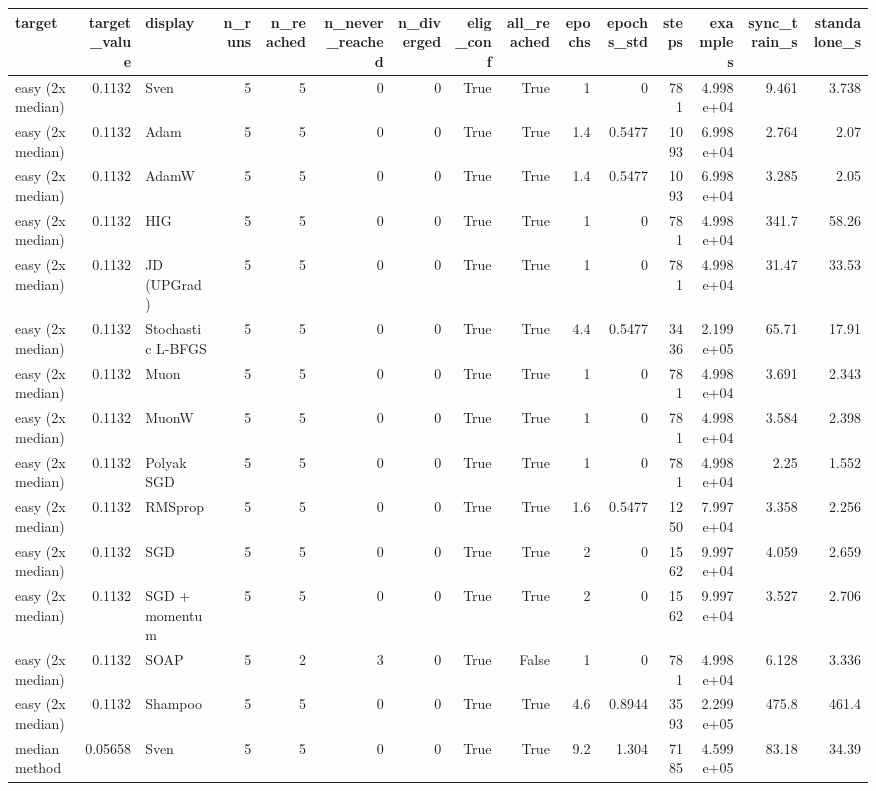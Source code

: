 \begin{tabular}{lrlrrrrrrrrrrrr}
\toprule
target & target\_value & display & n\_runs & n\_reached & n\_never\_reached & n\_diverged & elig\_conf & all\_reached & epochs & epochs\_std & steps & examples & sync\_train\_s & standalone\_s \\
\midrule
easy (2x median) & 0.1132 & Sven & 5 & 5 & 0 & 0 & True & True & 1 & 0 & 781 & 4.998e+04 & 9.461 & 3.738 \\
easy (2x median) & 0.1132 & Adam & 5 & 5 & 0 & 0 & True & True & 1.4 & 0.5477 & 1093 & 6.998e+04 & 2.764 & 2.07 \\
easy (2x median) & 0.1132 & AdamW & 5 & 5 & 0 & 0 & True & True & 1.4 & 0.5477 & 1093 & 6.998e+04 & 3.285 & 2.05 \\
easy (2x median) & 0.1132 & HIG & 5 & 5 & 0 & 0 & True & True & 1 & 0 & 781 & 4.998e+04 & 341.7 & 58.26 \\
easy (2x median) & 0.1132 & JD (UPGrad) & 5 & 5 & 0 & 0 & True & True & 1 & 0 & 781 & 4.998e+04 & 31.47 & 33.53 \\
easy (2x median) & 0.1132 & Stochastic L-BFGS & 5 & 5 & 0 & 0 & True & True & 4.4 & 0.5477 & 3436 & 2.199e+05 & 65.71 & 17.91 \\
easy (2x median) & 0.1132 & Muon & 5 & 5 & 0 & 0 & True & True & 1 & 0 & 781 & 4.998e+04 & 3.691 & 2.343 \\
easy (2x median) & 0.1132 & MuonW & 5 & 5 & 0 & 0 & True & True & 1 & 0 & 781 & 4.998e+04 & 3.584 & 2.398 \\
easy (2x median) & 0.1132 & Polyak SGD & 5 & 5 & 0 & 0 & True & True & 1 & 0 & 781 & 4.998e+04 & 2.25 & 1.552 \\
easy (2x median) & 0.1132 & RMSprop & 5 & 5 & 0 & 0 & True & True & 1.6 & 0.5477 & 1250 & 7.997e+04 & 3.358 & 2.256 \\
easy (2x median) & 0.1132 & SGD & 5 & 5 & 0 & 0 & True & True & 2 & 0 & 1562 & 9.997e+04 & 4.059 & 2.659 \\
easy (2x median) & 0.1132 & SGD + momentum & 5 & 5 & 0 & 0 & True & True & 2 & 0 & 1562 & 9.997e+04 & 3.527 & 2.706 \\
easy (2x median) & 0.1132 & SOAP & 5 & 2 & 3 & 0 & True & False & 1 & 0 & 781 & 4.998e+04 & 6.128 & 3.336 \\
easy (2x median) & 0.1132 & Shampoo & 5 & 5 & 0 & 0 & True & True & 4.6 & 0.8944 & 3593 & 2.299e+05 & 475.8 & 461.4 \\
median method & 0.05658 & Sven & 5 & 5 & 0 & 0 & True & True & 9.2 & 1.304 & 7185 & 4.599e+05 & 83.18 & 34.39 \\

\end{tabular}
